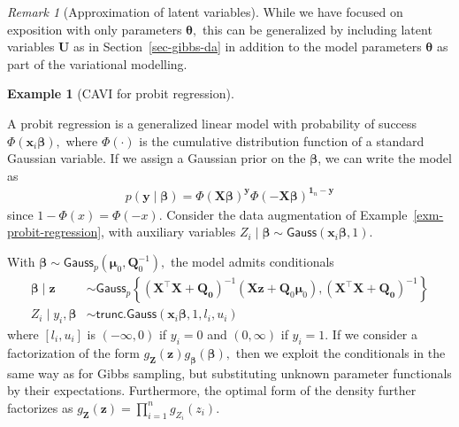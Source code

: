 \documentclass[
  11pt,
  letterpaper,
]{scrbook}
\theoremstyle{definition}
\theoremstyle{plain}
\theoremstyle{plain}
\theoremstyle{plain}
\theoremstyle{definition}
\newtheorem{example}{Example}[chapter]
\theoremstyle{definition}
\theoremstyle{remark}
\newtheorem{refremark}{Remark}[chapter]
\begin{document}
\begin{refremark}[Approximation of latent variables]
While we have focused on exposition with only parameters
\(\boldsymbol{\theta},\) this can be generalized by including latent
variables \(\boldsymbol{U}\) as in Section~\ref{sec-gibbs-da} in
addition to the model parameters \(\boldsymbol{\theta}\) as part of the
variational modelling.

\label{rem-approximation-latent}

\end{refremark}

\begin{example}[CAVI for probit
regression]\protect\hypertarget{exm-probit-reg-cavi}{}\label{exm-probit-reg-cavi}

A probit regression is a generalized linear model with probability of
success \(\Phi(\mathbf{x}_i\boldsymbol{\beta}),\) where \(\Phi(\cdot)\)
is the cumulative distribution function of a standard Gaussian variable.
If we assign a Gaussian prior on the \(\boldsymbol{\beta}\), we can
write the model as \begin{align*}
p(\boldsymbol{y} \mid \boldsymbol{\beta}) = \Phi(\mathbf{X}\boldsymbol{\beta})^{\boldsymbol{y}}\Phi(-\mathbf{X}\boldsymbol{\beta})^{\boldsymbol{1}_n -\boldsymbol{y}}
\end{align*} since \(1-\Phi(x) = \Phi(-x).\) Consider the data
augmentation of Example~\ref{exm-probit-regression}, with auxiliary
variables
\(Z_i \mid \boldsymbol{\beta}\sim \mathsf{Gauss}(\mathbf{x}_i\boldsymbol{\beta}, 1).\)

With
\(\boldsymbol{\beta} \sim \mathsf{Gauss}_p(\boldsymbol{\mu}_0, \mathbf{Q}_0^{-1}),\)
the model admits conditionals \begin{align*}
\boldsymbol{\beta} \mid \boldsymbol{z} &\sim \mathsf{Gauss}_p\left\{(\mathbf{X}^\top\mathbf{X} + \mathbf{Q_0})^{-1}(\mathbf{X}\boldsymbol{z} + \mathbf{Q}_0\boldsymbol{\mu}_0),  (\mathbf{X}^\top\mathbf{X} + \mathbf{Q_0})^{-1} \right\}
\\
Z_i \mid y_i, \boldsymbol{\beta} &\sim \mathsf{trunc. Gauss}(\mathbf{x}_i\boldsymbol{\beta}, 1, l_i, u_i) 
\end{align*} where \([l_i, u_i]\) is \((-\infty,0)\) if \(y_i=0\) and
\((0, \infty)\) if \(y_i=1.\) If we consider a factorization of the form
\(g_{\boldsymbol{Z}}(\boldsymbol{z})g_{\boldsymbol{\beta}}(\boldsymbol{\beta}),\)
then we exploit the conditionals in the same way as for Gibbs sampling,
but substituting unknown parameter functionals by their expectations.
Furthermore, the optimal form of the density further factorizes as
\(g_{\boldsymbol{Z}}(\boldsymbol{z}) = \prod_{i=1}^n g_{Z_i}(z_i).\)


\end{example}
\end{document}
